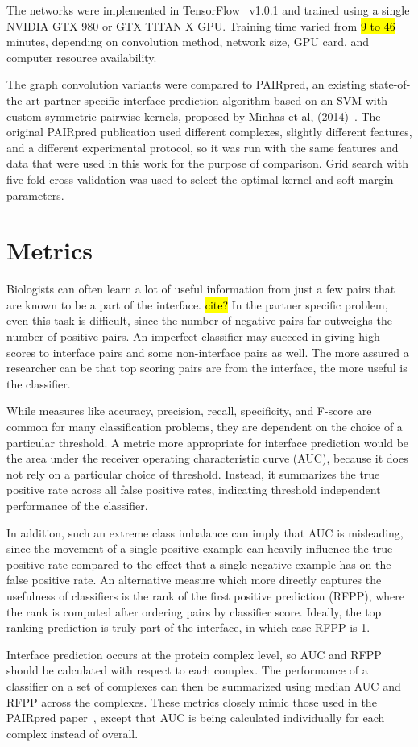 The networks were implemented in TensorFlow~\cite{abadi2015} v1.0.1 and trained using a single NVIDIA GTX 980 or GTX TITAN X GPU.
Training time varied from \hl{9 to 46} minutes, depending on convolution method, network size, GPU card, and computer resource availability.


The graph convolution variants were compared to PAIRpred, an existing state-of-the-art partner specific interface prediction algorithm based on an SVM with custom symmetric pairwise kernels, proposed by Minhas et al, (2014)~\cite{minhas2014}.
The original PAIRpred publication used different complexes, slightly different features, and a different experimental protocol, so it was run with the same features and data that were used in this work for the purpose of comparison.
Grid search with five-fold cross validation was used to select the optimal kernel and soft margin parameters.



\section{Metrics}

Biologists can often learn a lot of useful information from just a few pairs that are known to be a part of the interface. \hl{cite?}
In the partner specific problem, even this task is difficult, since the number of negative pairs far outweighs the number of positive pairs.
An imperfect classifier may succeed in giving high scores to interface pairs and some non-interface pairs as well.
The more assured a researcher can be that top scoring pairs are from the interface, the more useful is the classifier.

While measures like accuracy, precision, recall, specificity, and F-score are common for many classification problems, they are dependent on the choice of a particular threshold.
A metric more appropriate for interface prediction would be the area under the receiver operating characteristic curve (AUC), because it does not rely on a particular choice of threshold.
Instead, it summarizes the true positive rate across all false positive rates, indicating threshold independent performance of the classifier.

In addition, such an extreme class imbalance can imply that AUC is misleading, since the movement of a single positive example can heavily influence the true positive rate compared to the effect that a single negative example has on the false positive rate.
An alternative measure which more directly captures the usefulness of classifiers is the rank of the first positive prediction (RFPP), where the rank is computed after ordering pairs by classifier score.
Ideally, the top ranking prediction is truly part of the interface, in which case RFPP is 1.

Interface prediction occurs at the protein complex level, so AUC and RFPP should be calculated with respect to each complex. 
The performance of a classifier on a set of complexes can then be summarized using median AUC and RFPP across the complexes.
These metrics closely mimic those used in the PAIRpred paper~\cite{minhas2014}, except that AUC is being calculated individually for each complex instead of overall.
